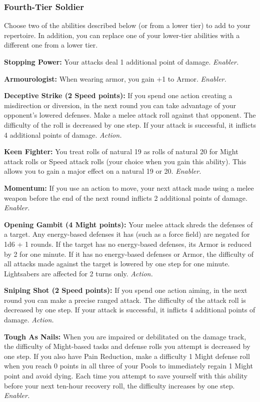 \documentclass[a4paper,10pt,final,twocolumn,oneside]{book}
\newcommand{\itemAbility}[2]{\textcolor{25gray}{\textbullet\textbf{ #1:}}{ #2}\par}
\newcommand{\enabler}{\textit{ Enabler.}}
\newcommand{\action}{\textit{ Action.}}
\begin{document}
\subsubsection*{Fourth-Tier Soldier}
\label{subsub:soldierFourthTier}

Choose two of the abilities described below (or from a lower tier) to add to your repertoire. In addition, you can replace one of your lower-tier abilities with a different one from a lower tier.

\itemAbility{Stopping Power}{Your attacks deal 1 additional point of damage.\enabler}

\itemAbility{Armourologist}{When wearing armor, you gain +1 to Armor.\enabler}

\itemAbility{Deceptive Strike (2 Speed points)}{If you spend one action creating a misdirection or diversion, in the next round you can take advantage of your opponent’s lowered defenses. Make a melee attack roll against that opponent. The difficulty of the roll is decreased by one step. If your attack is successful, it inflicts 4 additional points of damage.\action}

\itemAbility{Keen Fighter}{You treat rolls of natural 19 as rolls of natural 20 for Might attack rolls or Speed attack rolls (your choice when you gain this ability). This allows you to gain a major effect on a natural 19 or 20.\enabler}

\itemAbility{Momentum}{If you use an action to move, your next attack made using a melee weapon before the end of the next round inflicts 2 additional points of damage.\enabler}

\itemAbility{Opening Gambit (4 Might points)}{Your melee attack shreds the defenses of a target. Any energy-based defenses it has (such as a force field) are negated for 1d6 + 1 rounds. If the target has no energy-based defenses, its Armor is reduced by 2 for one minute. If it has no energy-based defenses or Armor, the difficulty of all attacks made against the target is lowered by one step for one minute. Lightsabers are affected for 2 turns only.\action}

\itemAbility{Sniping Shot (2 Speed points)}{If you spend one action aiming, in the next round you can make a precise ranged attack. The difficulty of the attack roll is decreased by one step. If your attack is successful, it inflicts 4 additional points of damage.\action}

\itemAbility{Tough As Nails}{When you are impaired or debilitated on the damage track, the difficulty of Might-based tasks and defense rolls you attempt is decreased by one step. If you also have Pain Reduction, make a difficulty 1 Might defense roll when you reach 0 points in all three of your Pools to immediately regain 1 Might point and avoid dying. Each time you attempt to save yourself with this ability before your next ten-hour recovery roll, the difficulty increases by one step.\enabler}
\end{document}
